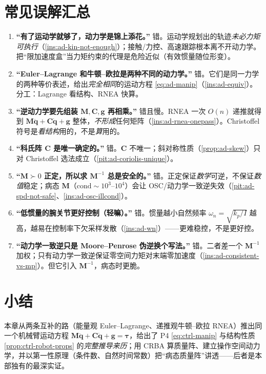 \section{常见误解汇总}
\label{sec:ad-misconceptions}

\begin{enumerate}
  \item \textbf{“有了运动学就够了，动力学是锦上添花。”} 错。运动学规划出的轨迹\emph{未必力矩可执行}（\cref{ins:ad-kin-not-enough}）；接触/力控、高速跟踪根本离不开动力学。把“限加速度盒”当力矩约束的代理是危险近似（有效惯量随位形变）。
  \item \textbf{“Euler--Lagrange 和牛顿--欧拉是两种不同的动力学。”} 错。它们是同一力学的两种等价表述，给出\emph{完全相同}的运动方程 \cref{eq:ad-manip}（\cref{ins:ad-equiv}）。分工：Lagrange 看结构、RNEA 快算。
  \item \textbf{“逆动力学要先组装 $\mathbf{M},\mathbf{C},\mathbf{g}$ 再相乘。”} 错且慢。RNEA 一次 $O(n)$ 递推就得到 $\mathbf{M}\ddot{\mathbf{q}}+\mathbf{C}\dot{\mathbf{q}}+\mathbf{g}$ 整体，\emph{不形成}任何矩阵（\cref{ins:ad-rnea-onepass}）。Christoffel 符号是\emph{看结构}用的，不是\emph{算}用的。
  \item \textbf{“科氏阵 $\mathbf{C}$ 是唯一确定的。”} 错。$\mathbf{C}$ 不唯一；斜对称性质（\cref{prop:ad-skew}）只对 Christoffel 选法成立（\cref{pit:ad-coriolis-unique}）。
  \item \textbf{“$\mathbf{M}\succ0$ 正定，所以求 $\mathbf{M}^{-1}$ 总是安全的。”} 错。正定保证\emph{数学}可逆，不保证\emph{数值}稳定；病态 $\mathbf{M}$（$\mathrm{cond}\sim10^3$--$10^4$）会让 OSC/动力学一致逆失效（\cref{pit:ad-spd-not-safe}、\cref{ins:ad-osc-illcond}）。
  \item \textbf{“低惯量的腕关节更好控制（轻嘛）。”} 错。惯量越小自然频率 $\omega_n=\sqrt{k_p/I}$ 越高，越易在控制率下欠采样发散（\cref{ins:ad-wn}）——更难稳控，不是更好控。
  \item \textbf{“动力学一致逆只是 Moore--Penrose 伪逆换个写法。”} 错。二者差一个 $\mathbf{M}^{-1}$ 加权；只有动力学一致逆保证零空间力矩对末端零加速度（\cref{ins:ad-consistent-vs-mp}）。但它引入 $\mathbf{M}^{-1}$，病态时更脆。
\end{enumerate}

\section{小结}
\label{sec:ad-summary}

本章从两条互补的路（能量观 Euler--Lagrange、递推观牛顿--欧拉 RNEA）推出同一个机械臂运动方程 $\mathbf{M}\ddot{\mathbf{q}}+\mathbf{C}\dot{\mathbf{q}}+\mathbf{g}=\boldsymbol{\tau}$，给出了 P4 \cref{eq:ctrl-manip} 与结构性质 \cref{prop:ctrl-robot-props} 的\emph{完整推导来历}；用 CRBA 算质量阵、建立操作空间动力学，并以第一性原理（条件数、自然时间常数）把“病态质量阵”讲透——后者是本部独有的最深实证。

